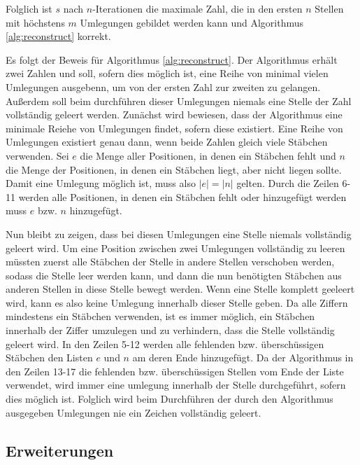 \documentclass[a4paper,10pt,ngerman]{scrartcl}
\begin{document}
Folglich ist $s$ nach $n$-Iterationen die maximale Zahl, die in den ersten $n$ Stellen mit höchstens $m$ Umlegungen gebildet werden kann und Algorithmus \ref*{alg:reconstruct} korrekt.

Es folgt der Beweis für Algorithmus \ref*{alg:reconstruct}.
Der Algorithmus erhält zwei Zahlen und soll, sofern dies möglich ist, eine Reihe von minimal vielen Umlegungen ausgebenn, um von der ersten Zahl zur zweiten zu gelangen. Außerdem soll beim durchführen dieser Umlegungen niemals eine Stelle der Zahl vollständig geleert werden. 
Zunächst wird bewiesen, dass der Algorithmus eine minimale Reiehe von Umlegungen findet, sofern diese existiert. Eine Reihe von Umlegungen existiert genau dann, wenn beide Zahlen gleich viele Stäbchen verwenden. 
Sei $e$ die Menge aller Positionen, in denen ein Stäbchen fehlt und $n$ die Menge der Positionen, in denen ein Stäbchen liegt, aber nicht liegen sollte. 
Damit eine Umlegung möglich ist, muss also $|e|= |n|$ gelten. 
Durch die Zeilen 6-11 werden alle Positionen, in denen ein Stäbchen fehlt oder hinzugefügt werden muss $e$ bzw. $n$ hinzugefügt.

Nun bleibt zu zeigen, dass bei diesen Umlegungen eine Stelle niemals vollständig geleert wird.
Um eine Position zwischen zwei Umlegungen vollständig zu leeren müssten zuerst alle Stäbchen der Stelle in andere Stellen verschoben werden, sodass die Stelle leer werden kann, und dann die nun benötigten Stäbchen aus anderen Stellen in diese Stelle bewegt werden. 
Wenn eine Stelle komplett geeleert wird, kann es also keine Umlegung innerhalb dieser Stelle geben. 
Da alle Ziffern mindestens ein Stäbchen verwenden, ist es immer möglich, ein Stäbchen innerhalb der Ziffer umzulegen und zu verhindern, dass die Stelle vollständig geleert wird. 
In den Zeilen 5-12 werden alle fehlenden bzw. überschüssigen Stäbchen den Listen $e$ und $n$ am deren Ende hinzugefügt. 
Da der Algorithmus in den Zeilen 13-17 die fehlenden bzw. überschüssigen Stellen vom Ende der Liste verwendet, wird immer eine umlegung innerhalb der Stelle durchgeführt, sofern dies möglich ist.
Folglich wird beim Durchführen der durch den Algorithmus ausgegeben Umlegungen nie ein Zeichen vollständig geleert.  


\subsection{Erweiterungen}
\end{document}
